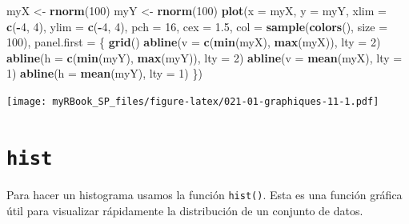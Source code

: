 \documentclass[
]{book}
\newenvironment{Shaded}{\begin{snugshade}}{\end{snugshade}}
\newcommand{\DataTypeTok}[1]{\textcolor[rgb]{0.13,0.29,0.53}{#1}}
\newcommand{\DecValTok}[1]{\textcolor[rgb]{0.00,0.00,0.81}{#1}}
\newcommand{\FloatTok}[1]{\textcolor[rgb]{0.00,0.00,0.81}{#1}}
\newcommand{\KeywordTok}[1]{\textcolor[rgb]{0.13,0.29,0.53}{\textbf{#1}}}
\newcommand{\NormalTok}[1]{#1}
\newcommand{\OperatorTok}[1]{\textcolor[rgb]{0.81,0.36,0.00}{\textbf{#1}}}
\newcommand{\StringTok}[1]{\textcolor[rgb]{0.31,0.60,0.02}{#1}}
\begin{document}
\begin{Shaded}
\begin{Highlighting}[]
\NormalTok{myX <-}\StringTok{ }\KeywordTok{rnorm}\NormalTok{(}\DecValTok{100}\NormalTok{)}
\NormalTok{myY <-}\StringTok{ }\KeywordTok{rnorm}\NormalTok{(}\DecValTok{100}\NormalTok{)}
\KeywordTok{plot}\NormalTok{(}\DataTypeTok{x =}\NormalTok{ myX, }\DataTypeTok{y =}\NormalTok{ myY, }
  \DataTypeTok{xlim =} \KeywordTok{c}\NormalTok{(}\OperatorTok{-}\DecValTok{4}\NormalTok{, }\DecValTok{4}\NormalTok{), }\DataTypeTok{ylim =} \KeywordTok{c}\NormalTok{(}\OperatorTok{-}\DecValTok{4}\NormalTok{, }\DecValTok{4}\NormalTok{),   }
  \DataTypeTok{pch =} \DecValTok{16}\NormalTok{, }\DataTypeTok{cex =} \FloatTok{1.5}\NormalTok{, }
  \DataTypeTok{col =} \KeywordTok{sample}\NormalTok{(}\KeywordTok{colors}\NormalTok{(), }\DataTypeTok{size =} \DecValTok{100}\NormalTok{),}
  \DataTypeTok{panel.first =}\NormalTok{ \{}
    \KeywordTok{grid}\NormalTok{()}
    \KeywordTok{abline}\NormalTok{(}\DataTypeTok{v =} \KeywordTok{c}\NormalTok{(}\KeywordTok{min}\NormalTok{(myX), }\KeywordTok{max}\NormalTok{(myX)), }\DataTypeTok{lty =} \DecValTok{2}\NormalTok{)}
    \KeywordTok{abline}\NormalTok{(}\DataTypeTok{h =} \KeywordTok{c}\NormalTok{(}\KeywordTok{min}\NormalTok{(myY), }\KeywordTok{max}\NormalTok{(myY)), }\DataTypeTok{lty =} \DecValTok{2}\NormalTok{)}
    \KeywordTok{abline}\NormalTok{(}\DataTypeTok{v =} \KeywordTok{mean}\NormalTok{(myX), }\DataTypeTok{lty =} \DecValTok{1}\NormalTok{)}
    \KeywordTok{abline}\NormalTok{(}\DataTypeTok{h =} \KeywordTok{mean}\NormalTok{(myY), }\DataTypeTok{lty =} \DecValTok{1}\NormalTok{)}
\NormalTok{\})}
\end{Highlighting}
\end{Shaded}

\texttt{[image: myRBook\_SP\_files/figure-latex/021-01-graphiques-11-1.pdf]}

\hypertarget{graph1hist}{%
\section{\texorpdfstring{\texttt{hist}}{hist}}\label{graph1hist}}

Para hacer un histograma usamos la función \texttt{hist()}. Esta es una función gráfica útil para visualizar rápidamente la distribución de un conjunto de datos.
\end{document}
